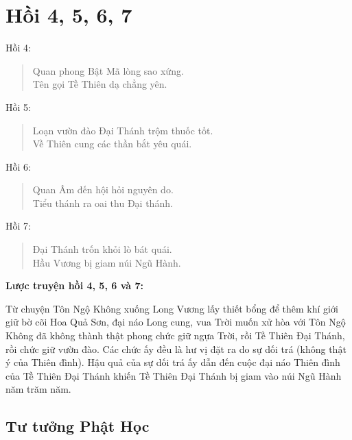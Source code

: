 \chapter{Hồi 4, 5, 6, 7} %
\label{cha:hoi_4_5_6_7}

Hồi 4:

\begin{verse}
\begin{itshape}
Quan phong Bật Mã lòng sao xứng.\\
Tên gọi Tề Thiên dạ chẳng yên.
\end{itshape}
\end{verse}

Hồi 5:

\begin{verse}
\begin{itshape}
Loạn vườn đào Đại Thánh trộm thuốc tốt.\\
Về Thiên cung các thần bắt yêu quái.
\end{itshape}
\end{verse}

Hồi 6:

\begin{verse}
\begin{itshape}
Quan Âm đến hội hỏi nguyên do.\\
Tiểu thánh ra oai thu Đại thánh.
\end{itshape}
\end{verse}

Hồi 7:

\begin{verse}
\begin{itshape}
Đại Thánh trốn khỏi lò bát quái.\\
Hầu Vương bị giam núi Ngũ Hành.
\end{itshape}
\end{verse}

{\bf Lược truyện hồi 4, 5, 6 và 7:}

Từ chuyện Tôn Ngộ Không xuống Long Vương lấy thiết bổng để thêm khí giới giữ bờ cõi Hoa Quả Sơn, đại náo Long cung, vua Trời muốn xử hòa với Tôn Ngộ Không đã không thành thật phong chức giữ ngựa Trời, rồi Tề Thiên Đại Thánh, rồi chức giữ vườn đào. Các chức ấy đều là hư vị đặt ra do sự dối trá (không thật ý của Thiên đình). Hậu quả của sự dối trá ấy dẫn đến cuộc đại náo Thiên đình của Tề Thiên Đại Thánh khiến Tề Thiên Đại Thánh bị giam vào núi Ngũ Hành năm trăm năm.

\section{Tư tưởng Phật Học} %
\label{sec:4_phat_hoc}

